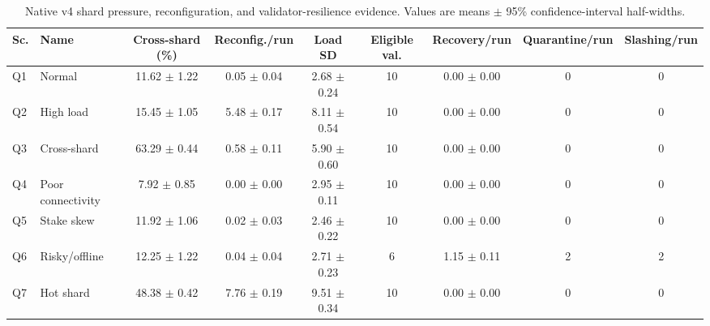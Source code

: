 \begin{table}[pos=t]
\centering
\caption{Native v4 shard pressure, reconfiguration, and validator-resilience evidence. Values are means $\pm$ 95\% confidence-interval half-widths.}
\label{tab:cpn_scalability_security_native}
\scriptsize
\setlength{\tabcolsep}{3.0pt}
\begin{tabular}{llccccccc}
\toprule
\textbf{Sc.} & \textbf{Name} & \textbf{Cross-shard (\%)} & \textbf{Reconfig./run} & \textbf{Load SD} & \textbf{Eligible val.} & \textbf{Recovery/run} & \textbf{Quarantine/run} & \textbf{Slashing/run}\\
\midrule
Q1 & Normal & 11.62 $\pm$ 1.22 & 0.05 $\pm$ 0.04 & 2.68 $\pm$ 0.24 & 10 & 0.00 $\pm$ 0.00 & 0 & 0\\
Q2 & High load & 15.45 $\pm$ 1.05 & 5.48 $\pm$ 0.17 & 8.11 $\pm$ 0.54 & 10 & 0.00 $\pm$ 0.00 & 0 & 0\\
Q3 & Cross-shard & 63.29 $\pm$ 0.44 & 0.58 $\pm$ 0.11 & 5.90 $\pm$ 0.60 & 10 & 0.00 $\pm$ 0.00 & 0 & 0\\
Q4 & Poor connectivity & 7.92 $\pm$ 0.85 & 0.00 $\pm$ 0.00 & 2.95 $\pm$ 0.11 & 10 & 0.00 $\pm$ 0.00 & 0 & 0\\
Q5 & Stake skew & 11.92 $\pm$ 1.06 & 0.02 $\pm$ 0.03 & 2.46 $\pm$ 0.22 & 10 & 0.00 $\pm$ 0.00 & 0 & 0\\
Q6 & Risky/offline & 12.25 $\pm$ 1.22 & 0.04 $\pm$ 0.04 & 2.71 $\pm$ 0.23 & 6 & 1.15 $\pm$ 0.11 & 2 & 2\\
Q7 & Hot shard & 48.38 $\pm$ 0.42 & 7.76 $\pm$ 0.19 & 9.51 $\pm$ 0.34 & 10 & 0.00 $\pm$ 0.00 & 0 & 0\\
\bottomrule
\end{tabular}
\end{table}